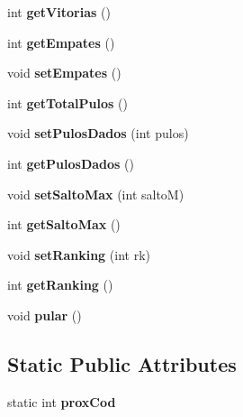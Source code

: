\begin{DoxyCompactItemize}
int {\bfseries get\+Vitorias} ()
\item 
\mbox{\label{classSapo_a24a527ff7ab06d1bde72a76fef41a17c}} 
int {\bfseries get\+Empates} ()
\item 
\mbox{\label{classSapo_a15f7d72a8fbf0bbafb6e0ba063ef3159}} 
void {\bfseries set\+Empates} ()
\item 
\mbox{\label{classSapo_a1c42d69b192516e31f0ba4b27f403745}} 
int {\bfseries get\+Total\+Pulos} ()
\item 
\mbox{\label{classSapo_a469d969c06f159e8e2b83b6b440c70f8}} 
void {\bfseries set\+Pulos\+Dados} (int pulos)
\item 
\mbox{\label{classSapo_a9b0fa3af63f26b61e822f71afe853e6c}} 
int {\bfseries get\+Pulos\+Dados} ()
\item 
\mbox{\label{classSapo_aef2c60d1546e0021f632f5335f26579d}} 
void {\bfseries set\+Salto\+Max} (int saltoM)
\item 
\mbox{\label{classSapo_a39434fac0fe2628882b63129602bff62}} 
int {\bfseries get\+Salto\+Max} ()
\item 
\mbox{\label{classSapo_a25efdd2311b4ac018e9ccd992add329e}} 
void {\bfseries set\+Ranking} (int rk)
\item 
\mbox{\label{classSapo_ada25b4278f827aab328aea02683ac29d}} 
int {\bfseries get\+Ranking} ()
\item 
\mbox{\label{classSapo_a32e61c61677967120ae652099bd56805}} 
void {\bfseries pular} ()
\end{DoxyCompactItemize}
\subsection*{Static Public Attributes}
\begin{DoxyCompactItemize}
\item 
\mbox{\label{classSapo_ae62aeea1bf0aa025fba6994c57d81d26}} 
static int {\bfseries prox\+Cod}
\end{DoxyCompactItemize}
